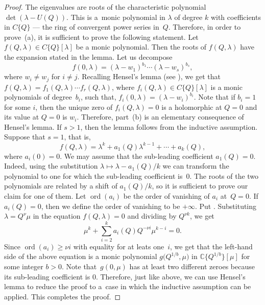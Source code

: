 \documentclass[10pt,a4paper]{article}
\numberwithin{equation}{section}
\newcommand{\CC}{\mathbb{C}}
\begin{document}
\begin{proof}
The eigenvalues are roots of the characteristic polynomial $\operatorname{det}(\lambda-U(Q))$. This is a~monic polynomial in $\lambda$ of degree $k$ with coefficients in $C\{Q\}$ --- the ring of convergent power series in~$Q$. Therefore, in order to prove~(a), it is sufficient to prove the following statement. Let~${f(Q,\lambda)\in C\{Q\}[\lambda]}$ be a monic polynomial. Then the roots of $f(Q,\lambda)$ have the expansion stated in the lemma. Let us decompose
\[
f(0,\lambda)=(\lambda -w_1)^{b_1}\cdots (\lambda -w_s)^{b_s},
\]
where $w_i\neq w_j$ for $i\neq j$. Recalling Hensel's lemma (see \cite[Chapter 2, Section 2]{GR}), we get that~${f(Q,\lambda) = f_1(Q,\lambda)\cdots f_r(Q,\lambda)}$, where $f_i(Q,\lambda)\in C\{Q\}[\lambda]$ is a monic polynomials of degree~$b_i$, such that, $f_i(0,\lambda)=(\lambda -w_i)^{b_i}$. Note that if $b_i=1$ for some $i$, then the unique zero of $f_i(Q,\lambda)=0$ is a holomorphic at $Q=0$ and its value at $Q=0$ is $w_i$. Therefore, part~(b) is an elementary consequence of Hensel's lemma. If $s>1$, then the lemma follows from the inductive assumption. Suppose that $s=1$, that is,
\[
f(Q,\lambda)=\lambda^k+a_1(Q)\lambda^{k-1}+\cdots + a_k(Q),
\]
where $a_i(0)=0$. We may assume that the sub-leading coefficient $a_1(Q)=0$. Indeed, using the substitution $\lambda\mapsto \lambda - a_1(Q)/k$ we can transform the polynomial to one for which the sub-leading coefficient is~$0$. The roots of the two polynomials are related by a shift of $a_1(Q)/k$, so it is sufficient to prove our claim for one of them. Let $\operatorname{ord}(a_i)$ be the order of vanishing of $a_i$ at~${Q=0}$. If $a_i(Q)=0$, then we define the order of vanishing to be $+\infty$. Put
.
Substituting $\lambda=Q^\nu \mu$ in the equation $f(Q,\lambda)=0$ and dividing by $Q^{\nu k}$, we get
\[
\mu^k+\sum_{i=2}^k a_i(Q)Q^{-\nu i} \mu^{k-i}=0.
\]
Since $\operatorname{ord}(a_i) \geq \nu i$ with equality for at leats one~$i$, we get that the left-hand side of the above equation is a monic polynomial $g\big(Q^{1/b},\mu\big)$ in $\CC\big\{Q^{1/b}\big\} [\mu]$ for some integer $b>0$. Note that~$g(0,\mu)$ has at least two different zeroes because its sub-leading coefficient is $0$. Therefore, just like above, we can use Hensel's lemma to reduce the proof to a~case in which the inductive assumption can be applied. This completes the proof.
\end{proof}
\end{document}
